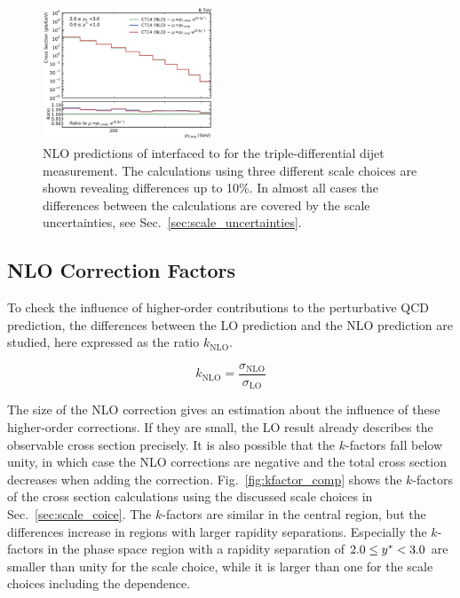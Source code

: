 \begin{figure}[htp]
    \includegraphics[width=0.45\textwidth]{figures/theory/nlo_xs_comp_yb2ys0.pdf}
    \caption[fastNLO prediction of triple-differential dijet cross section]{
        NLO predictions of \fastNLO interfaced to \NLOJETPP for the
        triple-differential dijet measurement. The calculations using three
        different scale choices are shown revealing differences up to 10\%. In
        almost all cases the differences between the calculations are covered by
        the scale uncertainties, see Sec.~\ref{sec:scale_uncertainties}.}
    \label{fig:xs_nlo_comp}
\end{figure}


\subsection{NLO Correction Factors}
\label{sec:k_factors}

To check the influence of higher-order contributions to the perturbative QCD
prediction, the differences between the LO prediction and the NLO
prediction are studied, here expressed as the ratio $k_\mathrm{NLO}$.

\begin{equation*}
    k_{\mathrm{NLO}} = \frac{\sigma_{\mathrm{NLO}}}{\sigma_{\mathrm{LO}}}
\end{equation*}

The size of the NLO correction gives an estimation about the influence of these
higher-order corrections. If they are small, the LO result already describes the
observable cross section precisely. It is also possible that the $k$-factors
fall below unity, in which case the NLO corrections are negative and the total cross
section decreases when adding the correction.  Fig.~\ref{fig:kfactor_comp} shows
the $k$-factors of the \NLOJETPP cross section calculations using the discussed
scale choices in Sec.~\ref{sec:scale_coice}. The $k$-factors are similar in the
central region, but the differences increase in regions with larger rapidity
separations. Especially the $k$-factors in the phase space region with a
rapidity separation of $2.0 \leq y^* < 3.0$ are smaller than unity for the
\ptavg scale choice, while it is larger than one for the scale choices including
the \ystar dependence.

